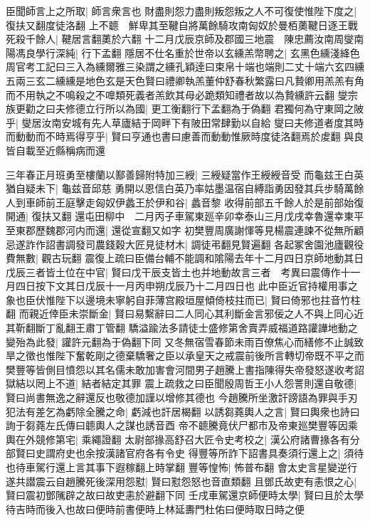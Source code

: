 臣聞師言上之所取|{
	師言衆言也}
財盡則怨力盡則叛怨叛之人不可復使惟陛下度之|{
	復扶又翻度徒洛翻}
上不聼　鮮卑其至鞬自將萬餘騎攻南匈奴於曼栢薁鞬日逐王戰死殺千餘人|{
	鞬居言翻薁於六翻}
十二月戊辰京師及郡國三地震　陳忠薦汝南周燮南陽馮良學行深純|{
	行下孟翻}
隱居不仕名重於世帝以玄纁羔幣聘之|{
	玄黑色纁淺絳色周官考工記曰三入為纁爾雅三染謂之纁孔穎逹曰束帛十端也端則二丈十端六玄四纁五兩三玄二纁纁是地色玄是天色賢曰禮卿執羔董仲舒春秋繁露曰凡贄卿用羔羔有角而不用執之不鳴殺之不嘷類死義者羔飲其母必跪類知禮者故以為贄纁許云翻}
燮宗族更勸之曰夫修德立行所以為國|{
	更工衡翻行下孟翻為于偽翻}
君獨何為守東岡之陂乎|{
	燮居汝南安城有先人草廬結于岡畔下有陂田常肆勤以自給}
燮曰夫修道者度其時而動動而不時焉得亨乎|{
	賢曰亨通也書曰慮善而動動惟厥時度徒洛翻焉於䖍翻}
與良皆自載至近縣稱病而還

三年春正月班勇至樓蘭以鄯善歸附特加三綬|{
	三綬疑當作王綬綬音受}
而龜兹王白英猶自疑未下|{
	龜兹音邱慈}
勇開以恩信白英乃率姑墨温宿自縛詣勇因發其兵步騎萬餘人到車師前王庭擊走匈奴伊蠡王於伊和谷|{
	蠡音黎}
收得前部五千餘人於是前部始復開通|{
	復扶又翻}
還屯田柳中　二月丙子車駕東廵辛卯幸泰山三月戊戌幸魯還幸東平至東郡歷魏郡河内而還|{
	還從宣翻又如字}
初樊豐周廣謝惲等見楊震連諫不從無所顧忌遂詐作詔書調發司農錢穀大匠見徒材木|{
	調徒弔翻見賢遍翻}
各起冢舍園池廬觀役費無數|{
	觀古玩翻}
震復上疏曰臣備台輔不能調和隂陽去年十二月四日京師地動其日戊辰三者皆土位在中官|{
	賢曰戊干辰支皆土也并地動故言三者　考異曰震傳作十一月四日按下文其日戊辰十一月丙申朔戊辰乃十二月四日也}
此中臣近官持權用事之象也臣伏惟陛下以邊境未寧躬自菲薄宫殿垣屋傾倚枝拄而已|{
	賢曰倚邪也拄音竹柱翻}
而親近倖臣未崇斷金|{
	賢曰易繫辭曰二人同心其利斷金言邪佞之人不與上同心近其靳翻斷丁亂翻王肅丁管翻}
驕溢踰法多請徒士盛修第舍賣弄威福道路讙譁地動之變殆為此發|{
	讙許元翻為于偽翻下同}
又冬無宿雪春節未雨百僚焦心而繕修不止誠致旱之徵也惟陛下奮乾剛之德棄驕奢之臣以承皇天之戒震前後所言轉切帝既不平之而樊豐等皆側目憤怨以其名儒未敢加害會河間男子趙騰上書指陳得失帝發怒遂收考詔獄結以罔上不道|{
	結者結定其罪}
震上疏救之曰臣聞殷周哲王小人怨詈則還自敬德|{
	賢曰尚書無逸之辭還反也敬德加謹以增修其德也}
今趙騰所坐激訐謗語為罪與手刃犯法有差乞為虧除全騰之命|{
	虧減也訐居楬翻}
以誘芻蕘輿人之言|{
	賢曰輿衆也詩曰詢于芻蕘左氏傳曰聼輿人之謀也誘音酉}
帝不聼騰竟伏尸都市及帝東廵樊豐等因乘輿在外競修第宅|{
	乘繩證翻}
太尉部掾高舒召大匠令史考校之|{
	漢公府諸曹掾各有分部賢曰史謂府史也余按漢諸官府各有令史}
得豐等所詐下詔書具奏須行還上之|{
	須待也待車駕行還上言其事下遐稼翻上時掌翻}
豐等惶怖|{
	怖普布翻}
會太史言星變逆行遂共譛震云自趙騰死後深用怨懟|{
	賢曰懟怨怒也音直類翻}
且鄧氏故吏有恚恨之心|{
	賢曰震初鄧隲辟之故曰故吏恚於避翻下同}
壬戌車駕還京師便時太學|{
	賢曰且於太學待吉時而後入也故曰便時前書便時上林延夀門杜佑曰便時取日時之便}
